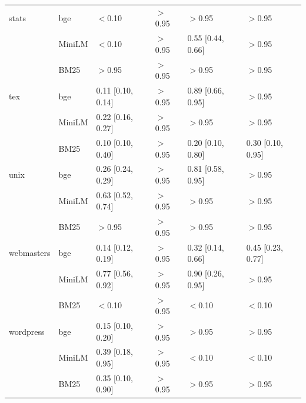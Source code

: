 \begin{tabular}{llllll}
stats & bge & $<$0.10 & $>$0.95 & $>$0.95 & $>$0.95\\
 & MiniLM & $<$0.10 & $>$0.95 & 0.55 [0.44, 0.66] & $>$0.95\\
 & BM25 & $>$0.95 & $>$0.95 & $>$0.95 & $>$0.95\\
\addlinespace[1pt]
tex & bge & 0.11 [0.10, 0.14] & $>$0.95 & 0.89 [0.66, 0.95] & $>$0.95\\
 & MiniLM & 0.22 [0.16, 0.27] & $>$0.95 & $>$0.95 & $>$0.95\\
 & BM25 & 0.10 [0.10, 0.40] & $>$0.95 & 0.20 [0.10, 0.80] & 0.30 [0.10, 0.95]\\
\addlinespace[1pt]
unix & bge & 0.26 [0.24, 0.29] & $>$0.95 & 0.81 [0.58, 0.95] & $>$0.95\\
 & MiniLM & 0.63 [0.52, 0.74] & $>$0.95 & $>$0.95 & $>$0.95\\
 & BM25 & $>$0.95 & $>$0.95 & $>$0.95 & $>$0.95\\
\addlinespace[1pt]
webmasters & bge & 0.14 [0.12, 0.19] & $>$0.95 & 0.32 [0.14, 0.66] & 0.45 [0.23, 0.77]\\
 & MiniLM & 0.77 [0.56, 0.92] & $>$0.95 & 0.90 [0.26, 0.95] & $>$0.95\\
 & BM25 & $<$0.10 & $>$0.95 & $<$0.10 & $<$0.10\\
\addlinespace[1pt]
wordpress & bge & 0.15 [0.10, 0.20] & $>$0.95 & $>$0.95 & $>$0.95\\
 & MiniLM & 0.39 [0.18, 0.95] & $>$0.95 & $<$0.10 & $<$0.10\\
 & BM25 & 0.35 [0.10, 0.90] & $>$0.95 & $>$0.95 & $>$0.95\\
\bottomrule\end{tabular}